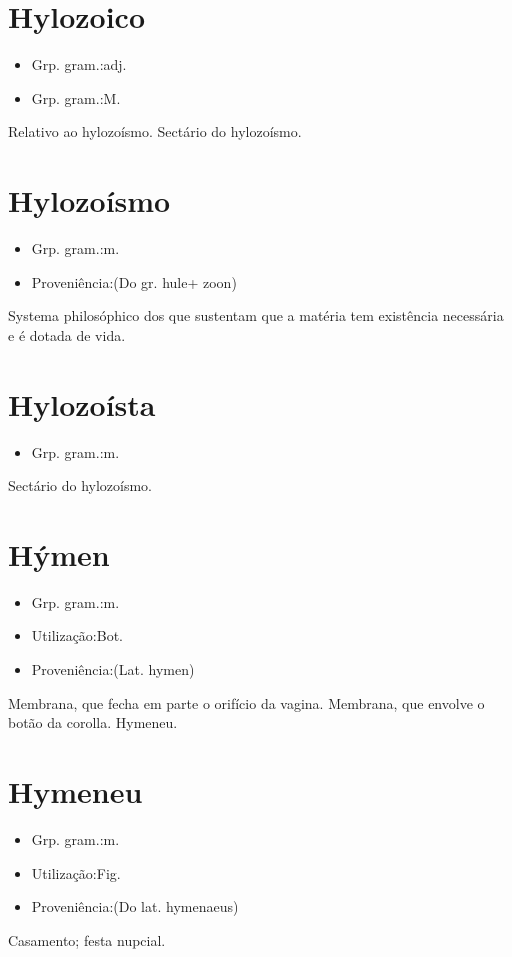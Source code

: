 \documentclass{article}
\begin{document}
\section{Hylozoico}
\begin{itemize}
\item {Grp. gram.:adj.}
\end{itemize}
\begin{itemize}
\item {Grp. gram.:M.}
\end{itemize}
Relativo ao hylozoísmo.
Sectário do hylozoísmo.
\section{Hylozoísmo}
\begin{itemize}
\item {Grp. gram.:m.}
\end{itemize}
\begin{itemize}
\item {Proveniência:(Do gr. \textunderscore hule\textunderscore  + \textunderscore zoon\textunderscore )}
\end{itemize}
Systema philosóphico dos que sustentam que a matéria tem existência necessária e é dotada de vida.
\section{Hylozoísta}
\begin{itemize}
\item {Grp. gram.:m.}
\end{itemize}
Sectário do hylozoísmo.
\section{Hýmen}
\begin{itemize}
\item {Grp. gram.:m.}
\end{itemize}
\begin{itemize}
\item {Utilização:Bot.}
\end{itemize}
\begin{itemize}
\item {Proveniência:(Lat. \textunderscore hymen\textunderscore )}
\end{itemize}
Membrana, que fecha em parte o orifício da vagina.
Membrana, que envolve o botão da corolla.
Hymeneu.
\section{Hymeneu}
\begin{itemize}
\item {Grp. gram.:m.}
\end{itemize}
\begin{itemize}
\item {Utilização:Fig.}
\end{itemize}
\begin{itemize}
\item {Proveniência:(Do lat. \textunderscore hymenaeus\textunderscore )}
\end{itemize}
Casamento; festa nupcial.
\end{document}
